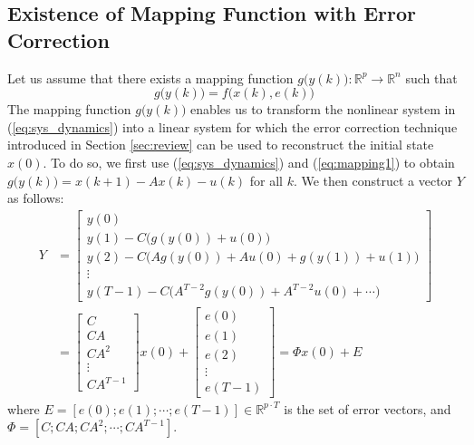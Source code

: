 \subsection{Existence of Mapping Function with Error Correction}\label{map_1}
Let us assume that there exists a mapping function $g\big(y(k)\big): \mathbb{R}^p \rightarrow \mathbb{R}^n$ such that
\begin{equation}\label{eq:mapping1}
g\big(y(k)\big)=f\big(x(k),e(k)\big)~
\end{equation}
The mapping function $g\big(y(k)\big)$ enables us to transform the nonlinear system in (\ref{eq:sys_dynamics}) into a linear system for which the error correction technique introduced in Section \ref{sec:review} can be used to reconstruct the initial state $x(0)$. To do so, we first use (\ref{eq:sys_dynamics}) and (\ref{eq:mapping1}) to obtain $g\big(y(k)\big)=x(k+1)-A x(k)-u(k)$ for all $k$. We then construct a vector $Y$ as follows:
\begin{equation}\label{map_1_error_correction}
\begin{aligned}
	Y&=\begin{bmatrix} y(0) \\ y(1) - C \big(g(y(0))+ u(0)\big)  \\
	y(2) - C \big( A g(y(0)) + A u(0) + g(y(1) ) + u(1) \big) \\ \vdots   \\
	y(T-1) - C \big(A^{T-2} g(y(0)) + A^{T-2} u(0) + \cdots \big) \end{bmatrix}
	\\&= \begin{bmatrix} C \\ CA \\ CA^2 \\  \vdots \\ CA^{T-1}  \end{bmatrix} x(0) + \begin{bmatrix} e(0) \\ e(1) \\ e(2) \\ \vdots  \\ e(T-1)\end{bmatrix} = \Phi x(0) + E
\end{aligned}
\end{equation}
where $E=[e(0);e(1);\cdots;e(T-1)]\in \mathbb{R}^{p \cdot T}$ is the set of error vectors, and $\Phi=[C;CA;CA^2;\cdots;CA^{T-1}]$.

